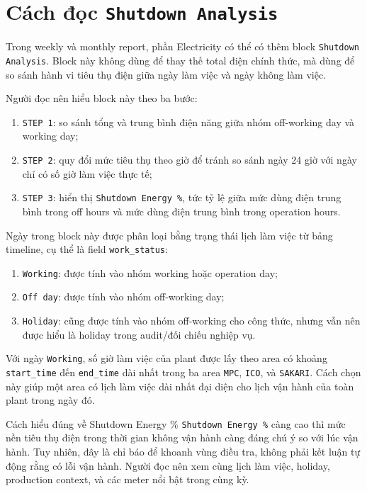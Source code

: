 \section{Cách đọc \texttt{Shutdown Analysis}}

Trong weekly và monthly report, phần Electricity có thể có thêm block \texttt{Shutdown Analysis}. Block này không dùng để thay thế total điện chính thức, mà dùng để so sánh hành vi tiêu thụ điện giữa ngày làm việc và ngày không làm việc.

Người đọc nên hiểu block này theo ba bước:

\begin{enumerate}[label=-]
\item \texttt{STEP 1}: so sánh tổng và trung bình điện năng giữa nhóm off-working day và working day;
\item \texttt{STEP 2}: quy đổi mức tiêu thụ theo giờ để tránh so sánh ngày 24 giờ với ngày chỉ có số giờ làm việc thực tế;
\item \texttt{STEP 3}: hiển thị \texttt{Shutdown Energy \%}, tức tỷ lệ giữa mức dùng điện trung bình trong off hours và mức dùng điện trung bình trong operation hours.
\end{enumerate}

Ngày trong block này được phân loại bằng trạng thái lịch làm việc từ bảng timeline, cụ thể là field \texttt{work\_status}:

\begin{enumerate}[label=-]
\item \texttt{Working}: được tính vào nhóm working hoặc operation day;
\item \texttt{Off day}: được tính vào nhóm off-working day;
\item \texttt{Holiday}: cũng được tính vào nhóm off-working cho công thức, nhưng vẫn nên được hiểu là holiday trong audit/đối chiếu nghiệp vụ.
\end{enumerate}

Với ngày \texttt{Working}, số giờ làm việc của plant được lấy theo area có khoảng \texttt{start\_time} đến \texttt{end\_time} dài nhất trong ba area \texttt{MPC}, \texttt{ICO}, và \texttt{SAKARI}. Cách chọn này giúp một area có lịch làm việc dài nhất đại diện cho lịch vận hành của toàn plant trong ngày đó.

\begin{ReaderNote}{Cách hiểu đúng về Shutdown Energy \%}
\texttt{Shutdown Energy \%} càng cao thì mức nền tiêu thụ điện trong thời gian không vận hành càng đáng chú ý so với lúc vận hành. Tuy nhiên, đây là chỉ báo để khoanh vùng điều tra, không phải kết luận tự động rằng có lỗi vận hành. Người đọc nên xem cùng lịch làm việc, holiday, production context, và các meter nổi bật trong cùng kỳ.
\end{ReaderNote}

